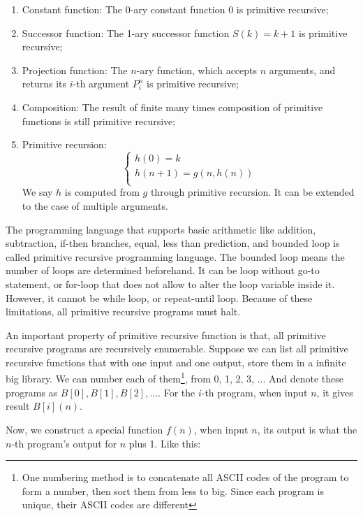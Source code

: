 \documentclass[b5paper]{article}
\begin{document}
\begin{enumerate}
\item Constant function: The 0-ary constant function 0 is primitive recursive;

\item Successor function: The 1-ary successor function $S(k) = k + 1$ is primitive recursive;

\item Projection function: The $n$-ary function, which accepts $n$ arguments, and returns its $i$-th argument $P_i^n$ is primitive recursive;

\item Composition: The result of finite many times composition of primitive functions is still primitive recursive;

\item Primitive recursion:
\[
\begin{cases}
h(0) = k \\
h(n + 1) = g(n, h(n)) \\
\end{cases}
\]
We say $h$ is computed from $g$ through primitive recursion. It can be extended to the case of multiple arguments.
\end{enumerate}

The programming language that supports basic arithmetic like addition, subtraction, if-then branches, equal, less than prediction, and bounded loop is called primitive recursive programming language. The bounded loop means the number of loops are determined beforehand. It can be loop without go-to statement, or for-loop that does not allow to alter the loop variable inside it. However, it cannot be while loop, or repeat-until loop. Because of these limitations, all primitive recursive programs must halt.

An important property of primitive recursive function is that, all primitive recursive programs are recursively enumerable. Suppose we can list all primitive recursive functions that with one input and one output, store them in a infinite big library. We can number each of them\footnote{One numbering method is to concatenate all ASCII codes of the program to form a number, then sort them from less to big. Since each program is unique, their ASCII codes are different}, from 0, 1, 2, 3, ... And denote these programs as $B[0], B[1], B[2], ...$. For the $i$-th program, when input $n$, it gives result $B[i](n)$.

Now, we construct a special function $f(n)$, when input $n$, its output is what the $n$-th program's output for $n$ plus 1. Like this:
\end{document}
